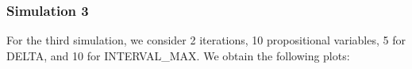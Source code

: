 \documentclass[runningheads]{llncs}
\begin{document}

\subsubsection{Simulation 3}
For the third simulation, we consider 2 iterations, 10 propositional variables, 5 for DELTA, and 10 for INTERVAL\_MAX. 
We obtain the following plots:
\end{document}
